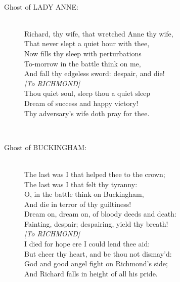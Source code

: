 \documentclass{article}
\begin{document}
\\
\begin{description}
\item[Ghost of LADY ANNE:] 
\hspace{1pt}\\
\hspace{1pt}Richard, thy wife, that wretched Anne thy wife,\\
\hspace{1pt}That never slept a quiet hour with thee,\\
\hspace{1pt}Now fills thy sleep with perturbations\\
\hspace{1pt}To-morrow in the battle think on me,\\
\hspace{1pt}And fall thy edgeless sword: despair, and die!\\
{\it [To RICHMOND]}\\
\hspace{1pt}Thou quiet soul, sleep thou a quiet sleep\\
\hspace{1pt}Dream of success and happy victory!\\
\hspace{1pt}Thy adversary's wife doth pray for thee.\\
\end{description}
\\
\begin{description}
\item[Ghost of BUCKINGHAM:] 
\hspace{1pt}\\
\hspace{1pt}The last was I that helped thee to the crown;\\
\hspace{1pt}The last was I that felt thy tyranny:\\
\hspace{1pt}O, in the battle think on Buckingham,\\
\hspace{1pt}And die in terror of thy guiltiness!\\
\hspace{1pt}Dream on, dream on, of bloody deeds and death:\\
\hspace{1pt}Fainting, despair; despairing, yield thy breath!\\
{\it [To RICHMOND]}\\
\hspace{1pt}I died for hope ere I could lend thee aid:\\
\hspace{1pt}But cheer thy heart, and be thou not dismay'd:\\
\hspace{1pt}God and good angel fight on Richmond's side;\\
\hspace{1pt}And Richard falls in height of all his pride.\\
\end{description}
\end{document}
